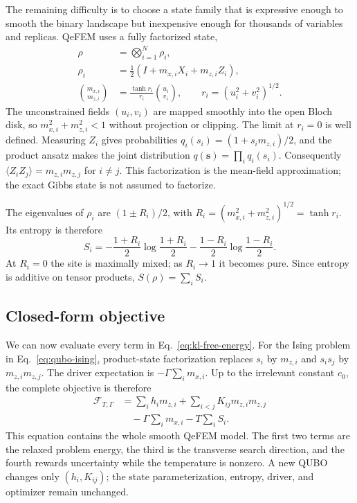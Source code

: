 \documentclass[
  aps,
  prx,
  reprint,
  amsmath,
  amssymb,
  groupedaddress,
  nofootinbib,
  floatfix,
  longbibliography
]{revtex4-2}
\newcommand{\qefem}{QeFEM}
\begin{document}
The remaining difficulty is to choose a state family that is expressive
enough to smooth the binary landscape but inexpensive enough for thousands of
variables and replicas.  \qefem{} uses a fully factorized state,
\begin{equation}
 \begin{aligned}
  \rho&=\bigotimes_{i=1}^{N}\rho_i,\\
  \rho_i&=\frac12(I+m_{x,i}X_i+m_{z,i}Z_i),\\
  \binom{m_{x,i}}{m_{z,i}}
  &=\frac{\tanh r_i}{r_i}\binom{u_i}{v_i},
  \qquad r_i=(u_i^2+v_i^2)^{1/2}.
 \end{aligned}
 \label{eq:product-state}
\end{equation}
The unconstrained fields $(u_i,v_i)$ are mapped smoothly into the open Bloch
disk, so $m_{x,i}^2+m_{z,i}^2<1$ without projection or clipping.  The limit at
$r_i=0$ is well defined.  Measuring $Z_i$ gives probabilities
$q_i(s_i)=(1+s_i m_{z,i})/2$, and the product ansatz makes the joint
distribution $q(\bm s)=\prod_i q_i(s_i)$.  Consequently
$\langle Z_iZ_j\rangle=m_{z,i}m_{z,j}$ for $i\ne j$.  This factorization is the
mean-field approximation; the exact Gibbs state is not assumed to factorize.

The eigenvalues of $\rho_i$ are $(1\pm R_i)/2$, with
$R_i=(m_{x,i}^2+m_{z,i}^2)^{1/2}=\tanh r_i$.  Its entropy is therefore
\begin{equation}
 S_i=-\frac{1+R_i}{2}\log\frac{1+R_i}{2}
     -\frac{1-R_i}{2}\log\frac{1-R_i}{2}.
 \label{eq:local-entropy}
\end{equation}
At $R_i=0$ the site is maximally mixed; as $R_i\to1$ it becomes pure.  Since
entropy is additive on tensor products, $S(\rho)=\sum_iS_i$.

\subsection{Closed-form objective}

We can now evaluate every term in Eq.~\eqref{eq:kl-free-energy}.  For the Ising
problem in Eq.~\eqref{eq:qubo-ising}, product-state factorization replaces
$s_i$ by $m_{z,i}$ and $s_i s_j$ by $m_{z,i}m_{z,j}$.  The driver expectation
is $-\Gamma\sum_i m_{x,i}$.  Up to the irrelevant constant $c_0$, the complete
objective is therefore
\begin{equation}
 \boxed{\begin{aligned}
 \mathcal F_{T,\Gamma}
 &=\sum_i h_i m_{z,i}
  +\sum_{i<j}K_{ij}m_{z,i}m_{z,j}\\
 &\quad-\Gamma\sum_i m_{x,i}-T\sum_iS_i .
 \end{aligned}}
 \label{eq:qefem-objective}
\end{equation}
This equation contains the whole smooth \qefem{} model.  The first two terms
are the relaxed problem energy, the third is the transverse search direction,
and the fourth rewards uncertainty while the temperature is nonzero.  A new
QUBO changes only $(h_i,K_{ij})$; the state parameterization, entropy, driver,
and optimizer remain unchanged.
\end{document}
